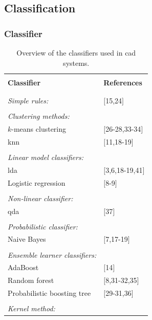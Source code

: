 \subsection{Classification} \label{subsec:classification}

\subsubsection{Classifier}

\begin{table}
	\caption{Overview of the classifiers used in \ac{cad} systems.}
	\small
	\begin{tabular}{p{.60\linewidth} p{.30\linewidth}}
		\hline \\ [-1.5ex]
		\textbf{Classifier} & \textbf{References} \\ \\ [-1.5ex]
		\hline \\ [-1.5ex]
		\textit{Simple rules:} & $[$15,24$]$ \\ \\ [-1.5ex]
		\textit{Clustering methods:} & \\
		\quad $k$-means clustering & $[$26-28,33-34$]$ \\
		\quad \acs{knn} & $[$11,18-19$]$ \\ \\ [-1.5ex]
		\textit{Linear model classifiers:} & \\
		\quad \acs{lda} & $[$3,6,18-19,41$]$ \\
		\quad Logistic regression & $[$8-9$]$ \\ \\ [-1.5ex]
		\textit{Non-linear classifier:} & \\
		\quad \acs{qda} & $[$37$]$ \\ \\ [-1.5ex]
		\textit{Probabilistic classifier:} & \\
		\quad Naive Bayes & $[$7,17-19$]$ \\ \\ [-1.5ex]
		\textit{Ensemble learner classifiers:} & \\
		\quad AdaBoost & $[$14$]$ \\
		\quad Random forest & $[$8,31-32,35$]$ \\
		\quad Probabilistic boosting tree & $[$29-31,36$]$ \\ \\ [-1.5ex]
		\textit{Kernel method:} & \\

\end{tabular}
\end{table}
